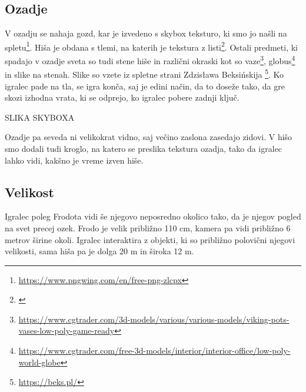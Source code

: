 \documentclass[a4paper,12pt]{article}
\begin{document}
\subsection{Ozadje}
\noindent  V ozadju se nahaja gozd, kar je izvedeno s skybox teksturo, ki smo jo našli na spletu\footnote{\url{https://www.pngwing.com/en/free-png-zlcpx}}. Hiša je obdana s tlemi, na katerih je tekstura z listi\footnote{\url{}}. Ostali predmeti, ki spadajo v ozadje sveta so tudi stene hiše in različni okraski kot so vaze\footnote{\url{https://www.cgtrader.com/3d-models/various/various-models/viking-pots-vases-low-poly-game-ready}}, globus\footnote{\url{https://www.cgtrader.com/free-3d-models/interior/interior-office/low-poly-world-globe}} in slike na stenah. Slike so vzete iz spletne strani Zdzisława Beksińskija \footnote{\url{https://beks.pl/}}. Ko igralec pade na tla, se igra konča, saj je edini način, da to doseže tako, da gre skozi izhodna vrata, ki se odprejo, ko igralec pobere zadnji ključ.

SLIKA SKYBOXA

Ozadje pa seveda ni velikokrat vidno, saj večino zaslona zasedajo zidovi. V hišo smo dodali tudi kroglo, na katero se preslika tekstura ozadja, tako da igralec lahko vidi, kakšno je vreme izven hiše.

\begin{figure}[h!]
    \centering
\end{figure}

\subsection{Velikost}
\noindent Igralec poleg Frodota vidi še njegovo neposredno okolico tako, da je njegov pogled na svet precej ozek. Frodo je velik približno 110 cm, kamera pa vidi približno 6 metrov širine okoli. Igralec interaktira z objekti, ki so približno polovični njegovi velikosti, sama hiša pa je dolga 20 m in široka 12 m.
\end{document}
